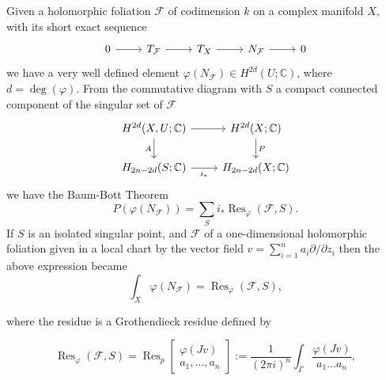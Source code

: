 \documentclass[12pt,reqno,a4paper]{amsart}
\numberwithin{equation}{section}
\theoremstyle{plain}
\theoremstyle{definition}
\DeclareMathOperator{\Res}{Res}
\newcommand{\cF}{\mathcal{F}}
\begin{document}
Given a holomorphic foliation $\cF$ of codimension $k$ on a complex manifold $X,$ with its short exact sequence
\[
\begin{tikzcd}
0 \arrow[r] & T_{\cF} \arrow[r] & T_X \arrow[r] & N_{\cF} \arrow[r] & 0
\end{tikzcd}
\]
we have a very well defined element $\varphi(N_{\cF}) \in H^{2d}(U;\mathbb{C})$, where $d = \deg(\varphi).$ From the commutative diagram with $S$ a compact connected component of the singular set of $\cF$
\[
\begin{tikzcd}
H^{2d}(X,U; \mathbb{C}) \arrow[r] \arrow[d, "A"'] &
H^{2d}(X; \mathbb{C}) \arrow[d, "P"] \\
H_{2n-2d}(S; \mathbb{C}) \arrow[r, "i_{\ast}"'] &
H_{2n-2d}(X; \mathbb{C})
\end{tikzcd}
\]
 we have the Baum-Bott Theorem \cite{BB1}
$$P(\varphi(N_{\cF})) = \sum_{ S} i_{\ast}\Res_{\varphi}(\cF, S).$$
If $S$ is an isolated singular point, and $\cF$ of a one-dimensional holomorphic foliation given in a local chart by the vector field 
$v = \sum_{i=1}^{n} a_i \partial /\partial z_i$
 then the above expression became 
$$\int_{X} \varphi(N_{\cF}) = \Res_{\varphi}(\cF, S),$$

\noindent where the residue is a Grothendieck residue defined by


$$\Res_{\varphi}(\cF, S) = \Res_{p} \left[
\begin{array}{cc}
\varphi(Jv)  \\
{a_1,\dots,a_{n}}
\end{array}\right] := \dfrac{1}{(2\pi {   i})^{n}}\int_{\Gamma} \dfrac{\varphi(Jv)}{a_1 \ldots a_n}, $$
\end{document}
